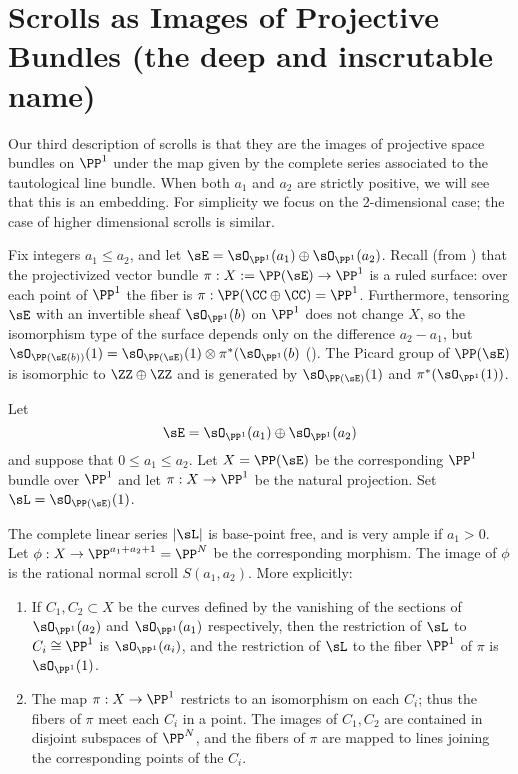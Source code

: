 \section{Scrolls as Images of Projective Bundles (the deep and inscrutable name)}\label{inscrutable name}


Our third description of scrolls is that they are the images of projective space bundles on $\PP^{1}$ under the map given by the complete series associated to the tautological line bundle. When both $a_{1}$ and $a_{2}$ are strictly positive, we will see that this is an embedding. For simplicity we focus on the 2-dimensional case; the case of higher dimensional scrolls is similar.

Fix integers $a_1\leq a_2$, and let $\sE = \sO_{\PP^1}(a_1) \oplus \sO_{\PP^1}(a_2)$. Recall (from \cite[***]{Hartshorne1977}) that the projectivized vector bundle
$\pi: X := \PP(\sE) \to \PP^1$ is a ruled surface: over each point of $\PP^1$ the fiber is $\pi: \PP(\CC\oplus \CC) = \PP^1$. 
Furthermore, tensoring
$\sE$ with an invertible sheaf $\sO_{\PP^1}(b)$ on $\PP^1$ does not change $X$, so the isomorphism type of the surface depends only on the difference $a_2-a_1$, but $\sO_{\PP(\sE(b))}(1) = \sO_{\PP(\sE)}(1) \otimes \pi^*(\sO_{\PP^1}(b)$
(\cite[****]{Hartshorne1977}). The Picard group of $\PP(\sE)$ is isomorphic to $\ZZ \oplus \ZZ$
and is generated by $\sO_{\PP(\sE)}(1)$ and $\pi^*(\sO_{\PP^1}(1))$.

\begin{theorem}
Let 
$$
\sE = \sO_{\PP^1}(a_1) \oplus \sO_{\PP^1}(a_2)
$$
and suppose that $0\leq a_1\leq a_2$. Let $X = \PP(\sE)$  be the corresponding $\PP^1$ bundle over $\PP^1$
and let $\pi: X \to \PP^1$ be the natural projection. Set $\sL =   \sO_{\PP(\sE)}(1)$.

The complete linear series $|\sL|$ is base-point free, and is very ample if $a_1>0$. 
Let $\phi:X\to \PP^{a_1+a_2+1} = \PP^N$ be the corresponding morphism. The image of $\phi$ is the rational normal scroll $S(a_1,a_2).$
More explicitly:
\begin{enumerate}
 \item If $C_1, C_2\subset X$ be the curves defined by the vanishing
of the sections of $\sO_{\PP^1}(a_2)$ and  $\sO_{\PP^1}(a_1)$ respectively, then the restriction of 
$\sL$ to $C_i \cong \PP^1$ is $\sO_{\PP^1}(a_i)$, and the restriction of $\sL$ to the fiber $\PP^1$ of $\pi$ is $\sO_{\PP^1}(1)$.
\item The map $\pi:X\to \PP^1$ restricts to an isomorphism on each $C_i$; thus the fibers of $\pi$ meet each $C_i$ in a point. The images of $C_1, C_2$ are contained in disjoint subspaces of $\PP^N$, and the fibers of $\pi$ are mapped 
to lines joining the corresponding points of the $C_i$.
\end{enumerate}
\end{theorem}

